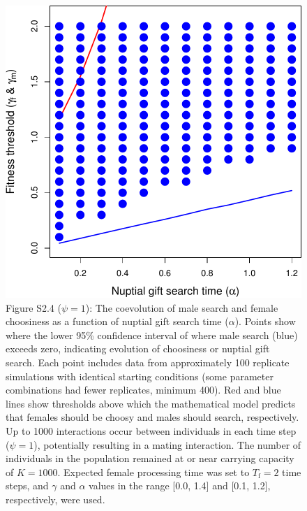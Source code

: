 \documentclass[
]{article}
\begin{document}
\captionsetup{labelformat=default}

\clearpage

\captionsetup{labelformat=empty}

\begin{figure}
\centering
\includegraphics{ms_biorxiv_files/figure-latex/unnamed-chunk-9-1.pdf}
\caption{Figure S2.4 (\(\psi = 1\)): The coevolution of male search and
female choosiness as a function of nuptial gift search time
(\(\alpha\)). Points show where the lower 95\% confidence interval of
where male search (blue) exceeds zero, indicating evolution of
choosiness or nuptial gift search. Each point includes data from
approximately 100 replicate simulations with identical starting
conditions (some parameter combinations had fewer replicates, minimum
400). Red and blue lines show thresholds above which the mathematical
model predicts that females should be choosy and males should search,
respectively. Up to 1000 interactions occur between individuals in each
time step (\(\psi = 1\)), potentially resulting in a mating interaction.
The number of individuals in the population remained at or near carrying
capacity of \(K = 1000\). Expected female processing time was set to
\(T_{\mathrm{f}}=2\) time steps, and \(\gamma\) and \(\alpha\) values in
the range {[}0.0, 1.4{]} and {[}0.1, 1.2{]}, respectively, were used.}
\end{figure}
\end{document}
